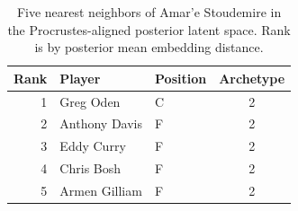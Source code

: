 \begin{table}[htbp]
  \centering\small
  \begin{tabular}{rllc}
    \toprule
    Rank & Player & Position & Archetype \\
    \midrule
    1 & Greg Oden & C & 2 \\
    2 & Anthony Davis & F & 2 \\
    3 & Eddy Curry & F & 2 \\
    4 & Chris Bosh & F & 2 \\
    5 & Armen Gilliam & F & 2 \\
    \bottomrule
  \end{tabular}
  \caption{Five nearest neighbors of Amar'e Stoudemire in the Procrustes-aligned posterior latent space. Rank is by posterior mean embedding distance.}
  \label{tab:Amar_e_Stoudemire_neighbors}
\end{table}

